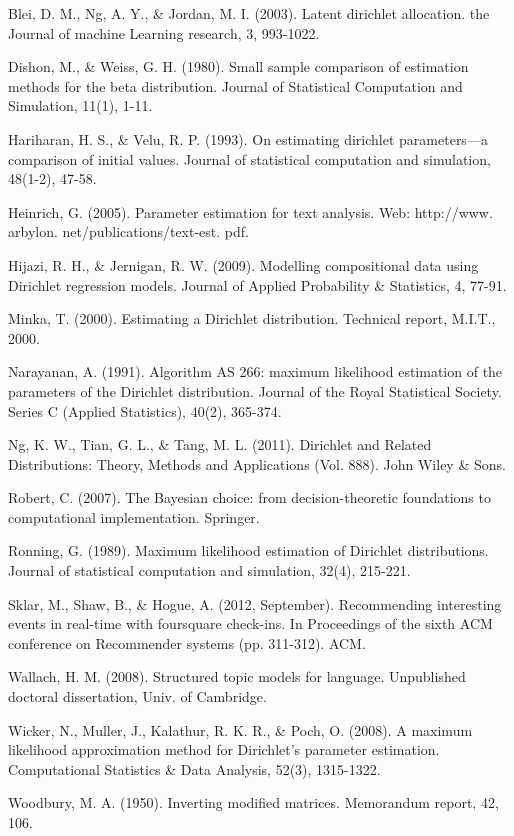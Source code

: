 \documentclass[twoside]{article}
\begin{document}
\begin{thebibliography}{20}

Blei, D. M., Ng, A. Y., \& Jordan, M. I. (2003). Latent dirichlet allocation. the Journal of machine Learning research, 3, 993-1022.

Dishon, M., \& Weiss, G. H. (1980). Small sample comparison of estimation methods for the beta distribution. Journal of Statistical Computation and Simulation, 11(1), 1-11.

Hariharan, H. S., \& Velu, R. P. (1993). On estimating dirichlet parameters—a comparison of initial values. Journal of statistical computation and simulation, 48(1-2), 47-58.

Heinrich, G. (2005). Parameter estimation for text analysis. Web: http://www. arbylon. net/publications/text-est. pdf.

Hijazi, R. H., \& Jernigan, R. W. (2009). Modelling compositional data using Dirichlet regression models. Journal of Applied Probability \& Statistics, 4, 77-91.

Minka, T. (2000). Estimating a Dirichlet distribution. Technical report, M.I.T., 2000.

Narayanan, A. (1991). Algorithm AS 266: maximum likelihood estimation of the parameters of the Dirichlet distribution. Journal of the Royal Statistical Society. Series C (Applied Statistics), 40(2), 365-374.

Ng, K. W., Tian, G. L., \& Tang, M. L. (2011). Dirichlet and Related Distributions: Theory, Methods and Applications (Vol. 888). John Wiley \& Sons.

Robert, C. (2007). The Bayesian choice: from decision-theoretic foundations to computational implementation. Springer.

Ronning, G. (1989). Maximum likelihood estimation of Dirichlet distributions. Journal of statistical computation and simulation, 32(4), 215-221.

Sklar, M., Shaw, B., \& Hogue, A. (2012, September). Recommending interesting events in real-time with foursquare check-ins. In Proceedings of the sixth ACM conference on Recommender systems (pp. 311-312). ACM.

Wallach, H. M. (2008). Structured topic models for language. Unpublished doctoral dissertation, Univ. of Cambridge.

Wicker, N., Muller, J., Kalathur, R. K. R., \& Poch, O. (2008). A maximum likelihood approximation method for Dirichlet's parameter estimation. Computational Statistics \& Data Analysis, 52(3), 1315-1322.

Woodbury, M. A. (1950). Inverting modified matrices. Memorandum report, 42, 106.

\end{thebibliography}
\end{document}

